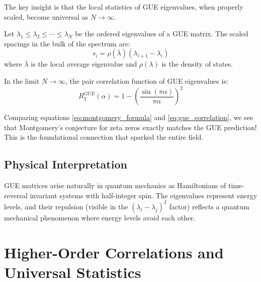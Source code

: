 The key insight is that the local statistics of GUE eigenvalues, when properly scaled, become universal as $N \to \infty$.

\begin{definition}
\label{def:scaled_spacings}
Let $\lambda_1 \leq \lambda_2 \leq \cdots \leq \lambda_N$ be the ordered eigenvalues of a GUE matrix. The scaled spacings in the bulk of the spectrum are:
\begin{equation}
s_i = \rho(\bar{\lambda}) (\lambda_{i+1} - \lambda_i)
\end{equation}
where $\bar{\lambda}$ is the local average eigenvalue and $\rho(\lambda)$ is the density of states.
\end{definition}

\begin{theorem}
\label{thm:gue_pair_correlation}
In the limit $N \to \infty$, the pair correlation function of GUE eigenvalues is:
\begin{equation}
R_2^{GUE}(\alpha) = 1 - \left(\frac{\sin(\pi \alpha)}{\pi \alpha}\right)^2
\label{eq:gue_correlation}
\end{equation}
\end{theorem}

\begin{highlight}
Comparing equations \eqref{eq:montgomery_formula} and \eqref{eq:gue_correlation}, we see that Montgomery's conjecture for zeta zeros exactly matches the GUE prediction! This is the foundational connection that sparked the entire field.
\end{highlight}

\subsection{Physical Interpretation}

\begin{remark}
GUE matrices arise naturally in quantum mechanics as Hamiltonians of time-reversal invariant systems with half-integer spin. The eigenvalues represent energy levels, and their repulsion (visible in the $(\lambda_i - \lambda_j)^2$ factor) reflects a quantum mechanical phenomenon where energy levels avoid each other.
\end{remark}

\section{Higher-Order Correlations and Universal Statistics}
\label{sec:higher_correlations}

